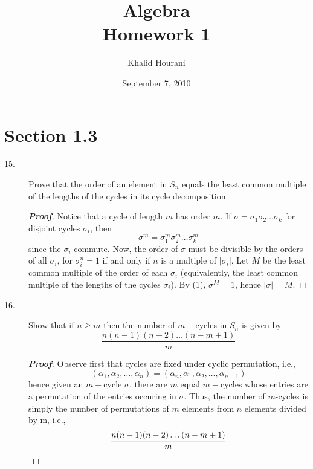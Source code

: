 \documentclass[12pt,leqno]{book}
\title{Algebra\\\large Homework 1}
\date{September 7, 2010}
\author{Khalid Hourani}
\theoremstyle{definition}
\newenvironment{Proof}{\begin{proof}[\textnormal{\textbf{Proof}}]}{\end{proof}}
\begin{document}
 \begin{titlepage}
  \maketitle
 \end{titlepage}

\section*{Section 1.3}
  \begin{description}
   \item [15.] Prove that the order of an element in $S_n$ equals the least common multiple of the lengths of the cycles in its cycle decomposition.
   \begin{Proof}
    Notice that a cycle of length $m$ has order $m$. If $\sigma=\sigma_1\sigma_2\hdots\sigma_k$ for disjoint cycles $\sigma_i$, then \[\sigma^m=\sigma_1^m\sigma_2^m\hdots\sigma_k^m\tag{1}\] since the $\sigma_i$ commute. Now, the order of $\sigma$ must be divisible by the orders of all $\sigma_i$, for $\sigma_i^n=1$ if and only if $n$ is a multiple of $|\sigma_i|$. Let $M$ be the least common multiple of the order of each $\sigma_i$ (equivalently, the least common multiple of the lengths of the cycles $\sigma_i$). By (1), $\sigma^M=1$, hence $|\sigma|=M$.
   \end{Proof}
   \item [16.] Show that if $n\geq m$ then the number of $m-$cycles in $S_n$ is given by \[\frac{n(n-1)(n-2)\hdots(n-m+1)}{m}\]
    \begin{Proof}
     Observe first that cycles are fixed under cyclic permutation, i.e., \[(\alpha_1,\alpha_2,\hdots,\alpha_n)=(\alpha_n,\alpha_1,\alpha_2,\hdots,\alpha_{n-1})\] hence given an $m-$cycle $\sigma$, there are $m$ equal $m-$cycles whose entries are a permutation of the entries occuring in $\sigma$. Thus, the number of $m$-cycles is simply the number of permutations of $m$ elements from $n$ elements divided by m, i.e., \[\frac{n(n-1)(n-2)\hdots(n-m+1)}{m}\qedhere\] 
    \end{Proof}
  \end{description}
\end{document}
